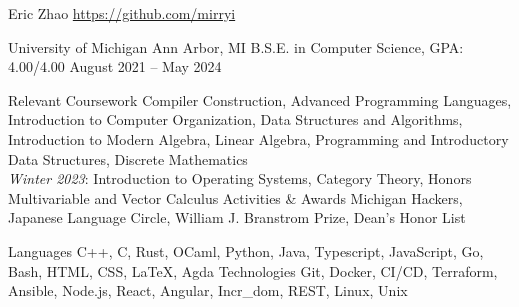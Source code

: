 \documentclass[letterpaper,11pt]{article}
\begin{document}
\rheading
  {Eric Zhao}
  {}
  {\href{https://github.com/mirryi}{https://github.com/mirryi}}
  {}

  \begin{rsectionlist}
    \rsectionitem%
      {University of Michigan}
      {Ann Arbor, MI}
      {B.S.E. in Computer Science, GPA: 4.00/4.00}
      {August 2021 -- May 2024}
      \begin{rpointlist}
        \rpoint
          {Relevant Coursework}
          {Compiler Construction, Advanced Programming Languages, Introduction to Computer
          Organization, Data Structures and Algorithms, Introduction to Modern Algebra, Linear
          Algebra, Programming and Introductory Data Structures, Discrete Mathematics \\
          \emph{Winter 2023}: Introduction to Operating Systems, Category Theory, Honors
          Multivariable and Vector Calculus}
        \rpoint
          {Activities \& Awards}
          {Michigan Hackers, Japanese Language Circle, William J. Branstrom Prize, Dean's Honor List}
      \end{rpointlist}
  \end{rsectionlist}

  \begin{rlinelist}
    \rline
      {Languages}
      {C++, C, Rust, OCaml, Python, Java, Typescript, JavaScript, Go, Bash, HTML, CSS, \LaTeX, Agda}
    \rline
      {Technologies}
      {Git, Docker, CI/CD, Terraform, Ansible, Node.js, React, Angular, Incr\_dom, REST, Linux, Unix}
  \end{rlinelist}
\end{document}
